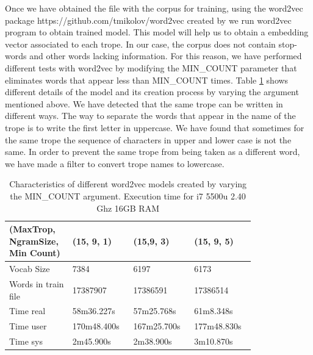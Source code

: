 \documentclass[letterpaper]{article}
\begin{document}
	Once we have obtained the file with the corpus for training, using the word2vec package https://github.com/tmikolov/word2vec created by
	\cite{mikolov2013} we run word2vec program to obtain trained model. This model will help us to obtain a embedding vector associated to each trope.
	In our case, the corpus does not contain stop-words and other words lacking information. For this reason, we have performed different tests with
	word2vec by modifying the MIN\_COUNT parameter that eliminates words that appear less than MIN\_COUNT times. Table \ref{tab:variations-with-min-count-argument-15-9}
	shows different details of the model and its creation process by varying the argument mentioned above.
	We have detected that the same trope can be written in different ways. The way to separate the words that appear in the name of the trope is to write
	the first letter in uppercase. We have found that sometimes for the same trope the sequence of characters in upper and lower case is not the same. 
	In order to prevent the same trope from being taken as a different word, we have made a filter to convert trope names to lowercase.
	
	
	\begin{table}[t]
		\centering
		\begin{tabular}{|p{0.20\linewidth}|p{0.2\linewidth}|p{0.2\linewidth}|p{0.2\linewidth}|}
			\hline
			\textbf{(MaxTrop, NgramSize, Min Count)}& \textbf{(15, 9, 1)} & \textbf{(15,9, 3)} & \textbf{(15, 9, 5)}\\
			\hline
			\hline
			Vocab Size& 7384 & 6197 & 6173 \\
			\hline
			Words in train file& 17387907 & 17386591 & 17386514 \\
			\hline
			Time real&58m36.227s&57m25.768s&61m8.348s\\
			\hline
			Time user&170m48.400s&167m25.700s&177m48.830s\\
			\hline
			Time sys&2m45.900s&2m38.900s&3m10.870s\\
			\hline
			
		\end{tabular}
		\caption{Characteristics of different word2vec models created by varying the MIN\_COUNT argument. Execution time for i7 5500u 2.40 Ghz 16GB RAM}
		\label{tab:variations-with-min-count-argument-15-9}
	\end{table}	
	
\end{document}
